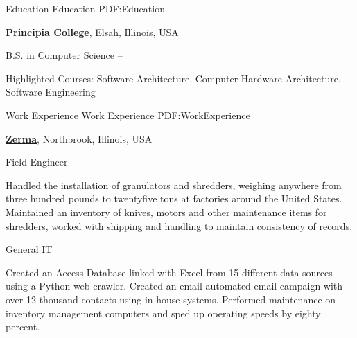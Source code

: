 \documentclass[a4paper,MMMyyyy,nonstopmode]{simpleresumecv}
\newcommand{\CVAuthor}{Bjørn Mathisen}
\newcommand{\CVWebpage}{https://bjornmathisen.com/}
\begin{document}

\Title{\CVAuthor}

\begin{SubTitle}
\href{https://goo.gl/maps/PwzyUhnuM922} %
{265 Melody Lane, Carpentersville, Illinois 60110, USA}
\par
\href{mailto:thebcm27@gmail.com}
{thebcm27@gmail.com}
\,\SubBulletSymbol\,
+1\,(224)\,622-8543
\,\SubBulletSymbol\,
\href{\CVWebpage}
{\url{Bjørn Mathisen}
\end{SubTitle}

\begin{Body}


\Section
{Education}
{Education}
{PDF:Education}

\Entry
\href{http://www.principiacollege.edu/}
{\textbf{Principia College}},
Elsah, Illinois, USA

\Gap
\BulletItem
B.S. in
\href{http://www.principiacollege.edu/computer-science}
{Computer Science}
\hfill
{} --
\begin{Detail}
\SubBulletItem
Highlighted Courses: Software Architecture, Computer Hardware Architecture, Software Engineering 
\end{Detail}


\Section
{Work\newline
Experience}
{Work Experience}
{PDF:WorkExperience}

\Entry
\href{https://zerma.com/en}
{\textbf{Zerma}},
Northbrook, Illinois, USA

\Gap
\BulletItem
Field Engineer
\hfill
{} --
\begin{Detail}
\SubBulletItem
Handled the installation of granulators and shredders, weighing anywhere from three hundred pounds to twentyfive tons at factories around the United States. 
\SubBulletItem
Maintained an inventory of knives, motors and other maintenance items for shredders, worked with shipping and handling to maintain consistency of records. 
\end{Detail}
\BulletItem
General IT
\begin{Detail}
\SubBulletItem
Created an Access Database linked with Excel from 15 different data sources using a Python web crawler. 
Created an email automated email campaign with over 12 thousand contacts using in house systems.
\SubBulletItem
Performed maintenance on inventory management computers and sped up operating speeds by eighty percent.
\end{Detail}


\end{Body}
\end{document}
